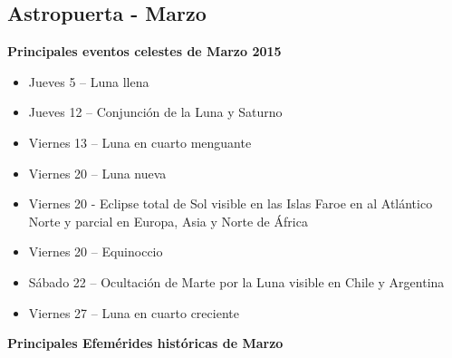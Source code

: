 \documentclass{book}
\begin{document}
\subsection{Astropuerta - Marzo}

\textbf{Principales eventos celestes de Marzo 2015}
\begin{itemize}

\item    Jueves 5 – Luna llena
\item    Jueves 12 – Conjunción de la Luna y Saturno
\item    Viernes 13 – Luna en cuarto menguante
\item    Viernes 20 – Luna nueva
\item    Viernes 20 - Eclipse total de Sol visible en las Islas Faroe en al Atlántico Norte y parcial en Europa, Asia y Norte de África
\item    Viernes 20 – Equinoccio
\item    Sábado 22 – Ocultación de Marte por la Luna visible en Chile y Argentina
\item    Viernes 27 – Luna en cuarto creciente
\end{itemize}

\textbf{Principales Efemérides históricas de Marzo}
\end{document}
